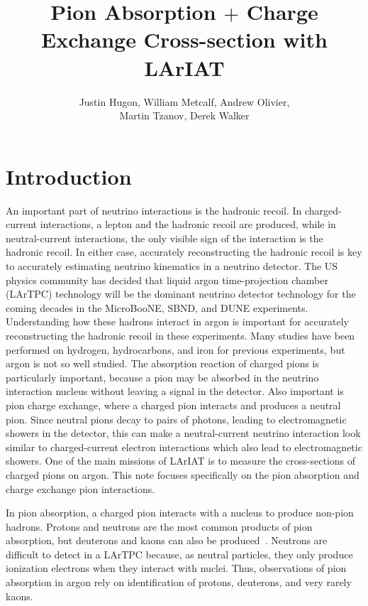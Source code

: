 \documentclass[letterpaper,12pt]{article}
\title{Pion Absorption $+$ Charge Exchange Cross-section with LArIAT}
\author{Justin Hugon, William Metcalf, Andrew Olivier,\\Martin Tzanov, Derek Walker}
\begin{document}
\maketitle

\tableofcontents

\section{Introduction}

An important part of neutrino interactions is the hadronic recoil.  In
charged-current interactions, a lepton and the hadronic recoil are produced,
while in neutral-current interactions, the only visible sign of the interaction
is the hadronic recoil. In either case, accurately reconstructing the hadronic
recoil is key to accurately estimating neutrino kinematics in a neutrino
detector. The US physics community has decided that liquid argon
time-projection chamber (LArTPC) technology will be the dominant neutrino
detector technology for the coming decades in the MicroBooNE, SBND, and DUNE
experiments. Understanding how these hadrons interact in argon is important
for accurately reconstructing the hadronic recoil in these experiments. Many
studies have been performed on hydrogen, hydrocarbons, and iron for previous
experiments, but argon is not so well studied.  The absorption reaction of
charged pions is particularly important, because a pion may be absorbed in the
neutrino interaction nucleus without leaving a signal in the detector.  Also
important is pion charge exchange, where a charged pion interacts and produces
a neutral pion. Since neutral pions decay to pairs of photons, leading to
electromagnetic showers in the detector, this can make a neutral-current
neutrino interaction look similar to charged-current electron interactions
which also lead to electromagnetic showers.  One of the main missions of LArIAT
is to measure the cross-sections of charged pions on argon.  This note focuses
specifically on the pion absorption and charge exchange pion interactions.

In pion absorption, a charged pion interacts with a nucleus to produce non-pion
hadrons. Protons and neutrons are the most common products of pion absorption,
but deuterons and kaons can also be
produced~\cite{Kotlinski:1998vh,Rowntree:1999dp,Kotlinski:2000hp,Androic:2001tq}.
Neutrons are difficult to detect in a LArTPC because, as neutral particles,
they only produce ionization electrons when they interact with nuclei. Thus,
observations of pion absorption in argon rely on identification of protons,
deuterons, and very rarely kaons.
\end{document}
